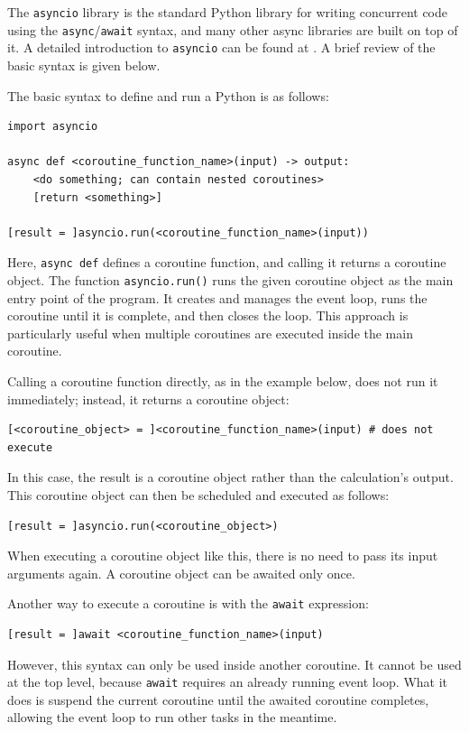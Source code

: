 The \verb|asyncio| library is the standard Python library for writing concurrent code using the \verb|async|/\verb|await| syntax, and many other async libraries are built on top of it. A detailed introduction to \verb|asyncio| can be found at \cite{python2025asyncio}. A brief review of the basic syntax is given below.

The basic syntax to define and run a Python  is as follows:
\begin{lstlisting}
import asyncio

async def <coroutine_function_name>(input) -> output:
    <do something; can contain nested coroutines>
    [return <something>]
    
[result = ]asyncio.run(<coroutine_function_name>(input))
\end{lstlisting}
Here, \texttt{async def} defines a coroutine function, and calling it returns a coroutine object. The function \texttt{asyncio.run()} runs the given coroutine object as the main entry point of the program. It creates and manages the event loop, runs the coroutine until it is complete, and then closes the loop. This approach is particularly useful when multiple coroutines are executed inside the main coroutine.

Calling a coroutine function directly, as in the example below, does not run it immediately; instead, it returns a coroutine object:
\begin{lstlisting}
[<coroutine_object> = ]<coroutine_function_name>(input) # does not execute
\end{lstlisting}
In this case, the result is a coroutine object rather than the calculation’s output. This coroutine object can then be scheduled and executed as follows:
\begin{lstlisting}
[result = ]asyncio.run(<coroutine_object>)
\end{lstlisting}
When executing a coroutine object like this, there is no need to pass its input arguments again. A coroutine object can be awaited only once.

Another way to execute a coroutine is with the \verb|await| expression:
\begin{lstlisting}
[result = ]await <coroutine_function_name>(input)
\end{lstlisting}
However, this syntax can only be used inside another coroutine. It cannot be used at the top level, because \verb|await| requires an already running event loop. What it does is suspend the current coroutine until the awaited coroutine completes, allowing the event loop to run other tasks in the meantime.

